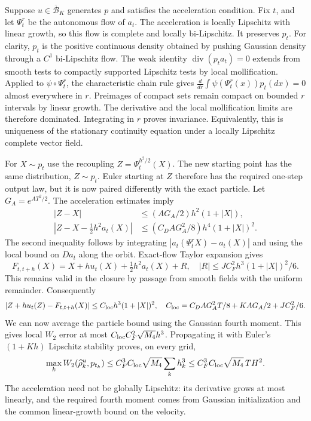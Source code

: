 Suppose $u\in\overline{\mathcal B}_K$ generates $p$ and satisfies the
acceleration condition. Fix $t$, and let $\Psi_t^r$ be the autonomous flow
of $a_t$. The acceleration is locally Lipschitz with linear growth, so
this flow is complete and locally bi-Lipschitz. It preserves $p_t$.
For clarity, $p_t$ is the positive continuous density obtained by pushing
Gaussian density through a $C^1$ bi-Lipschitz flow. The weak identity
$\operatorname{div}(p_ta_t)=0$ extends from smooth tests to compactly
supported Lipschitz tests by local mollification. Applied to
$\psi\circ\Psi_t^r$, the characteristic chain rule gives
$\frac{d}{dr}\int\psi(\Psi_t^r(x))p_t(dx)=0$ almost everywhere in $r$.
Preimages of compact sets remain compact on bounded $r$ intervals by
linear growth. The derivative and the local mollification limits are
therefore dominated. Integrating in $r$ proves invariance. Equivalently,
this is uniqueness of the stationary continuity equation under a locally
Lipschitz complete vector field.

For $X\sim p_t$ use the recoupling $Z=\Psi_t^{h^2/2}(X)$.
The new starting point has the same distribution, $Z\sim p_t$.
Euler starting at $Z$ therefore has the required one-step output law, but
it is now paired differently with the exact particle. Let $G_A=e^{AT^2/2}$.
The acceleration estimates imply
\begin{align*}
 |Z-X|&\le (A G_A/2)h^2(1+|X|),\\
 |Z-X-\tfrac12h^2a_t(X)|
 &\le (C_D A G_A^2/8)h^4(1+|X|)^2.
\end{align*}
The second inequality follows by integrating
$|a_t(\Psi_t^rX)-a_t(X)|$ and using the local bound on $Da_t$ along
the orbit. Exact-flow Taylor expansion gives
\[
 F_{t,t+h}(X)=X+hu_t(X)+\tfrac12h^2a_t(X)+R,
 \quad |R|\le JC_F^2h^3(1+|X|)^2/6.
\]
This remains valid in the closure by passage from smooth fields with the
uniform remainder. Consequently
\begin{equation}
 |Z+hu_t(Z)-F_{t,t+h}(X)|
 \le C_{\rm loc}h^3(1+|X|)^2,
 \quad C_{\rm loc}=C_D A G_A^2T/8+KA G_A/2+JC_F^2/6.
 \label{eq:AP-local}
\end{equation}
We can now average the particle bound using the Gaussian fourth moment.
This gives local $W_2$ error at most
$C_{\rm loc}C_F^2\sqrt{M_4}h^3$. Propagating it with Euler's
$(1+Kh)$ Lipschitz stability proves, on every grid,
\begin{equation}
 \max_k W_2(\widehat\rho_k^u,p_{t_k})
 \le C_F^3 C_{\rm loc}\sqrt{M_4}\sum_kh_k^3
 \le C_F^3 C_{\rm loc}\sqrt{M_4}\,TH^2.
 \label{eq:AP-global}
\end{equation}
The acceleration need not be globally Lipschitz: its derivative grows at
most linearly, and the required fourth moment comes from Gaussian
initialization and the common linear-growth bound on the velocity.

